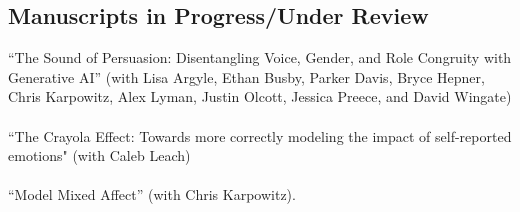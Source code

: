 \documentclass[10pt]{article}
\begin{document}
\begin{flushleft}
\subsection*{Manuscripts in Progress/Under Review}
\end{flushleft}
\noindent
``The Sound of Persuasion: Disentangling Voice, Gender, and Role Congruity with Generative AI'' (with Lisa Argyle, Ethan Busby, Parker Davis, Bryce Hepner, Chris Karpowitz, Alex Lyman, Justin Olcott, Jessica Preece, and David Wingate)\\
\ \\
``The Crayola Effect: Towards more correctly modeling the impact of self-reported emotions" (with Caleb Leach)\\
\ \\
``Model Mixed Affect'' (with Chris Karpowitz).\\
\end{document}
